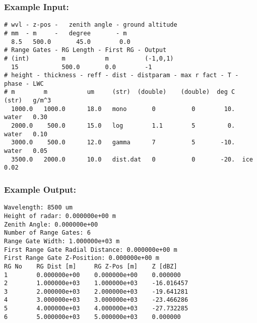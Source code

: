 \subsubsection{Example Input:}
\begin{Verbatim}[fontsize=\scriptsize,frame=single]
# wvl - z-pos -   zenith angle - ground altitude
# mm  - m     -   degree       - m
  8.5   500.0       45.0        0.0
# Range Gates - RG Length - First RG - Output
# (int)         m           m          (-1,0,1)
  15            500.0       0.0        -1
# height - thickness - reff - dist - distparam - max r fact - T - phase - LWC
# m        m           um     (str)  (double)    (double)  deg C  (str)   g/m^3
  1000.0   1000.0      18.0   mono       0          0        10.  water   0.30
  2000.0    500.0      15.0   log        1.1        5         0.  water   0.10
  3000.0    500.0      12.0   gamma      7          5       -10.  water   0.05
  3500.0   2000.0      10.0   dist.dat   0          0       -20.  ice     0.02
\end{Verbatim}

\subsubsection{Example Output:}
\begin{Verbatim}[fontsize=\scriptsize,frame=single]
Wavelength: 8500 um
Height of radar: 0.000000e+00 m
Zenith Angle: 0.000000e+00
Number of Range Gates: 6
Range Gate Width: 1.000000e+03 m
First Range Gate Radial Distance: 0.000000e+00 m
First Range Gate Z-Position: 0.000000e+00 m
RG No    RG Dist [m]     RG Z-Pos [m]    Z [dBZ]
1        0.000000e+00    0.000000e+00    0.000000
2        1.000000e+03    1.000000e+03    -16.016457
3        2.000000e+03    2.000000e+03    -19.641281
4        3.000000e+03    3.000000e+03    -23.466286
5        4.000000e+03    4.000000e+03    -27.732285
6        5.000000e+03    5.000000e+03    0.000000
\end{Verbatim}


